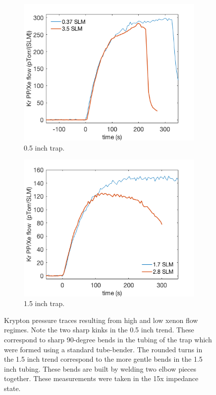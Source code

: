 \documentclass[12pt]{article}
\begin{document}
\begin{figure}[h!]
\centering
\begin{subfigure}{0.5\textwidth}
  \centering
  \includegraphics[width=\textwidth]{Figures/SLAC_flow_turnover.png}
  \caption{0.5 inch trap.}
  \label{fig:KrDrop0p5}
\end{subfigure}%
\begin{subfigure}{0.5\textwidth}
  \centering
  \includegraphics[width=\textwidth]{Figures/SLAC_flow_turnover_1p5in.png}
  \caption{1.5 inch trap.}
  \label{fig:KrDrop1p5}
\end{subfigure}
\caption{Krypton pressure traces resulting from high and low xenon flow regimes. Note the two sharp kinks in the 0.5 inch trend. These correspond to sharp 90-degree bends in the tubing of the trap which were formed using a standard tube-bender. The rounded turns in the 1.5 inch trend correspond to the more gentle bends in the 1.5 inch tubing. These bends are built by welding two elbow pieces together. These measurements were taken in the 15x impedance state.} 
\label{fig:KrDrop}
\end{figure}
\end{document}
